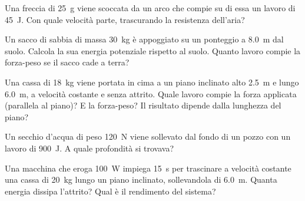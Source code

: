 \begin{esercizio}
Una freccia di \SI{25}{\gram} viene scoccata da un arco che compie su di essa un lavoro di \SI{45}{\joule}. Con quale velocità parte, trascurando la resistenza dell'aria?\\
\end{esercizio}

\begin{esercizio}
Un sacco di sabbia di massa \SI{30}{\kilo\gram} è appoggiato su un ponteggio a \SI{8,0}{\metre} dal suolo. Calcola la sua energia potenziale rispetto al suolo. Quanto lavoro compie la forza-peso se il sacco cade a terra?\\
\end{esercizio}

\begin{esercizio}
Una cassa di \SI{18}{\kilo\gram} viene portata in cima a un piano inclinato alto \SI{2,5}{\metre} e lungo \SI{6,0}{\metre}, a velocità costante e senza attrito. Quale lavoro compie la forza applicata (parallela al piano)? E la forza-peso? Il risultato dipende dalla lunghezza del piano?\\
\end{esercizio}

\begin{esercizio}
Un secchio d'acqua di peso \SI{120}{\newton} viene sollevato dal fondo di un pozzo con un lavoro di \SI{900}{\joule}. A quale profondità si trovava?\\
\end{esercizio}

\begin{esercizio}
Una macchina che eroga \SI{100}{\watt} impiega \SI{15}{\second} per trascinare a velocità costante una cassa di \SI{20}{\kilo\gram} lungo un piano inclinato, sollevandola di \SI{6,0}{\metre}. Quanta energia dissipa l'attrito? Qual è il rendimento del sistema?\\
\end{esercizio}

